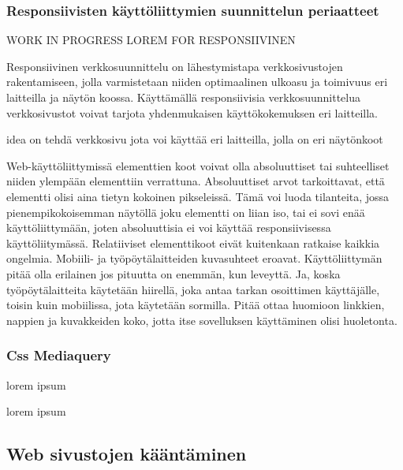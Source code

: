 \documentclass[11pt,a4paper,titlepage,oneside]{article}
\begin{document}
\subsubsection{Responsiivisten käyttöliittymien suunnittelun periaatteet}

WORK IN PROGRESS LOREM FOR RESPONSIIVINEN
\medskip


Responsiivinen verkkosuunnittelu on lähestymistapa verkkosivustojen rakentamiseen, jolla varmistetaan niiden optimaalinen ulkoasu ja toimivuus eri laitteilla ja näytön koossa.
Käyttämällä responsiivisia verkkosuunnittelua verkkosivustot voivat tarjota yhdenmukaisen käyttökokemuksen eri laitteilla.

idea on tehdä verkkosivu jota voi käyttää eri laitteilla, jolla on eri näytönkoot
\medskip


Web-käyttöliittymissä elementtien koot voivat olla absoluuttiset tai suhteelliset niiden ylempään elementtiin verrattuna. Absoluuttiset arvot tarkoittavat, että elementti olisi aina tietyn kokoinen pikseleissä. 
Tämä voi luoda tilanteita, jossa pienempikokoisemman näytöllä joku elementti on liian iso, tai ei sovi enää käyttöliittymään, joten absoluuttisia ei voi käyttää responsiivisessa käyttöliitymässä.
Relatiiviset elementtikoot eivät kuitenkaan ratkaise kaikkia ongelmia. Mobiili- ja työpöytälaitteiden kuvasuhteet eroavat. Käyttöliittymän pitää olla erilainen jos pituutta on enemmän, kun leveyttä. 
Ja, koska työpöytälaitteita käytetään hiirellä, joka antaa tarkan osoittimen käyttäjälle, toisin kuin mobiilissa, jota käytetään sormilla. 
Pitää ottaa huomioon linkkien, nappien ja kuvakkeiden koko, jotta itse sovelluksen käyttäminen olisi huoletonta.\medskip
\medskip




\subsubsection{Css Mediaquery}

lorem ipsum

lorem ipsum






\newpage
\subsection{Web sivustojen kääntäminen}
\end{document}

